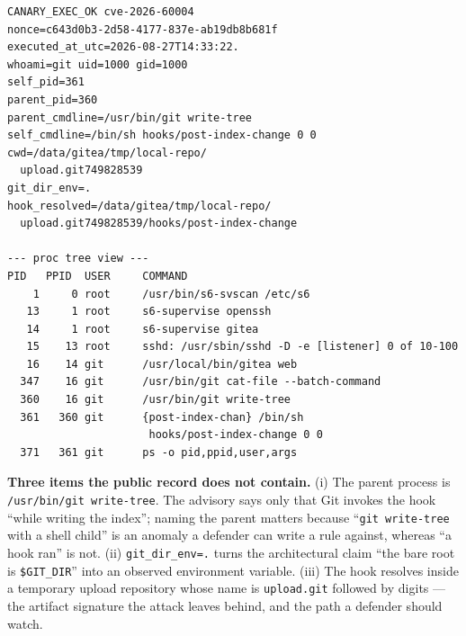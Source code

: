 \documentclass[journal]{IEEEtran}
\begin{document}
\begin{lstlisting}[style=transcript,
caption={Process-level proof, read out of band from the target after the attack
(\texttt{evidence/canary-content.txt}, a 940-byte file; long lines are wrapped
here for column width). Top block: the hook reporting its own lineage --- the
executed nonce, \texttt{uid=1000(git)}, its own PID 361 and command line, and
parent 360. Bottom block: the container process tree captured \emph{by the hook
itself}, showing \texttt{s6-supervise gitea} $\rightarrow$ \texttt{gitea web}
$\rightarrow$ \texttt{git write-tree} $\rightarrow$ the hook shell. The
truncated \texttt{executed\_at\_utc} fraction is a busybox \texttt{date}
limitation documented in Section~\ref{sec:negative}; the proof is the nonce and
the lineage, not the timestamp.},
label={lst:canary}]
CANARY_EXEC_OK cve-2026-60004
nonce=c643d0b3-2d58-4177-837e-ab19db8b681f
executed_at_utc=2026-08-27T14:33:22.
whoami=git uid=1000 gid=1000
self_pid=361
parent_pid=360
parent_cmdline=/usr/bin/git write-tree
self_cmdline=/bin/sh hooks/post-index-change 0 0
cwd=/data/gitea/tmp/local-repo/
  upload.git749828539
git_dir_env=.
hook_resolved=/data/gitea/tmp/local-repo/
  upload.git749828539/hooks/post-index-change

--- proc tree view ---
PID   PPID  USER     COMMAND
    1     0 root     /usr/bin/s6-svscan /etc/s6
   13     1 root     s6-supervise openssh
   14     1 root     s6-supervise gitea
   15    13 root     sshd: /usr/sbin/sshd -D -e [listener] 0 of 10-100
   16    14 git      /usr/local/bin/gitea web
  347    16 git      /usr/bin/git cat-file --batch-command
  360    16 git      /usr/bin/git write-tree
  361   360 git      {post-index-chan} /bin/sh
                      hooks/post-index-change 0 0
  371   361 git      ps -o pid,ppid,user,args
\end{lstlisting}

\textbf{Three items the public record does not contain.} (i) The parent process
is \texttt{/usr/bin/git write-tree}. The advisory says only that Git invokes the
hook ``while writing the index''; naming the parent matters because
``\texttt{git write-tree} with a shell child'' is an anomaly a defender can write
a rule against, whereas ``a hook ran'' is not. (ii) \texttt{git\_dir\_env=.}
turns the architectural claim ``the bare root is \texttt{\$GIT\_DIR}'' into an
observed environment variable. (iii) The hook resolves inside a temporary upload
repository whose name is \texttt{upload.git} followed by digits --- the artifact
signature the attack leaves behind, and the path a defender should watch.
\end{document}
